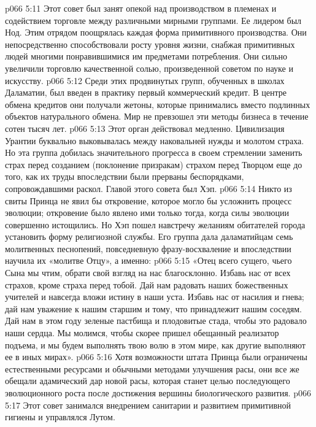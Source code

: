 \vs p066 5:11 \bibnobreakspace {} Этот совет был занят опекой над производством в племенах и содействием торговле между различными мирными группами. Ее лидером был Нод. Этим отрядом поощрялась каждая форма примитивного производства. Они непосредственно способствовали росту уровня жизни, снабжая примитивных людей многими понравившимися им предметами потребления. Они сильно увеличили торговлю качественной солью, произведенной советом по науке и искусству.
\vs p066 5:12 Среди этих продвинутых групп, обученных в школах Даламатии, был введен в практику первый коммерческий кредит. В центре обмена кредитов они получали жетоны, которые принимались вместо подлинных объектов натурального обмена. Мир не превзошел эти методы бизнеса в течение сотен тысяч лет.
\vs p066 5:13 \bibnobreakspace {} Этот орган действовал медленно. Цивилизация Урантии буквально выковывалась между наковальней нужды и молотом страха. Но эта группа добилась значительного прогресса в своем стремлении заменить страх перед созданием (поклонение призракам) страхом перед Творцом еще до того, как их труды впоследствии были прерваны беспорядками, сопровождавшими раскол. Главой этого совета был Хэп.
\vs p066 5:14 Никто из свиты Принца не явил бы откровение, которое могло бы усложнить процесс эволюции; откровение было явлено ими только тогда, когда силы эволюции совершенно истощились. Но Хэп пошел навстречу желаниям обитателей города установить форму религиозной службы. Его группа дала даламатийцам семь молитвенных песнопений, повседневную фразу\hyp{}восхваление и впоследствии научила их «молитве Отцу», а именно:
\vs p066 5:15 \pc «Отец всего сущего, чьего Сына мы чтим, обрати свой взгляд на нас благосклонно. Избавь нас от всех страхов, кроме страха перед тобой. Дай нам радовать наших божественных учителей и навсегда вложи истину в наши уста. Избавь нас от насилия и гнева; дай нам уважение к нашим старшим и тому, что принадлежит нашим соседям. Дай нам в этом году зеленые пастбища и плодовитые стада, чтобы это радовало наши сердца. Мы молимся, чтобы скорее пришел обещанный реализатор подъема, и мы будем выполнять твою волю в этом мире, как другие выполняют ее в иных мирах».
\vs p066 5:16 \pc Хотя возможности штата Принца были ограничены естественными ресурсами и обычными методами улучшения расы, они все же обещали адамический дар новой расы, которая станет целью последующего эволюционного роста после достижения вершины биологического развития.
\vs p066 5:17 \bibnobreakspace {} Этот совет занимался внедрением санитарии и развитием примитивной гигиены и управлялся Лутом.
